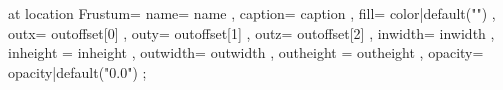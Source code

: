 \pic[shift={ {{- inoffset -}} }] at {{ location }} {
    Frustum={
        name={{ name }},
        caption={{ caption }},
        fill={{ color|default("\ConvColor") }},
        outx={{ outoffset[0] }},
        outy={{ outoffset[1] }},
        outz={{ outoffset[2] }},
        inwidth={{ inwidth }},
        inheight ={{ inheight }},
        outwidth={{ outwidth }},
        outheight ={{ outheight }},
        opacity={{ opacity|default("0.0") }}
    }
};
